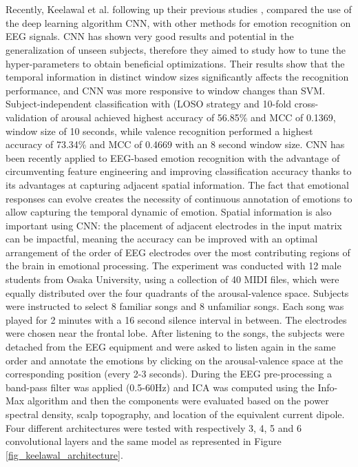 \\
\\
Recently, Keelawal et al. \cite{keelawat_comparative_2021} following up their previous studies \cite{thammasan_continuous_2016}, \cite{keelawat_spatiotemporal_2019} compared the use of the deep learning algorithm \ac{CNN}, with other methods for emotion recognition on \ac{EEG} signals. \ac{CNN} has shown very good results and potential in the generalization of unseen subjects, therefore they aimed to study how to tune the hyper-parameters to obtain beneficial optimizations. Their results show that the temporal information in distinct window sizes significantly affects the recognition performance, and \ac{CNN} was more responsive to window changes than \ac{SVM}. Subject-independent classification with (\ac{LOSO} strategy and 10-fold cross-validation of arousal achieved highest accuracy of 56.85\% and \ac{MCC} of 0.1369, window size of 10 seconds, while valence recognition performed a highest accuracy of 73.34\% and \ac{MCC} of 0.4669 with an 8 second window size. \ac{CNN} has been recently applied to EEG-based emotion recognition with the advantage of circumventing feature engineering and improving classification accuracy thanks to its advantages at capturing adjacent spatial information. The fact that emotional responses can evolve creates the necessity of continuous annotation of emotions to allow capturing the temporal dynamic of emotion. Spatial information is also important using \ac{CNN}: the placement of adjacent electrodes in the input matrix can be impactful, meaning the accuracy can be improved with an optimal arrangement of the order of \ac{EEG} electrodes over the most contributing regions of the brain in emotional processing.
The experiment was conducted with 12 male students from Osaka University, using a collection of 40 MIDI files, which were equally distributed over the four quadrants of the arousal-valence space. Subjects were instructed to select 8 familiar songs and 8 unfamiliar songs. Each song was played for 2 minutes with a 16 second silence interval in between. The electrodes were chosen near the frontal lobe. After listening to the songs, the subjects were detached from the \ac{EEG} equipment and were asked to listen again in the same order and annotate the emotions by clicking on the arousal-valence space at the corresponding position (every 2-3 seconds). During the \ac{EEG} pre-processing a band-pass filter was applied (0.5-60Hz) and \ac{ICA} was computed using the Info-Max algorithm and then the components were evaluated based on the power spectral density, scalp topography, and location of the equivalent current dipole.
Four different architectures were tested with respectively 3, 4, 5 and 6 convolutional layers and the same model as represented in Figure \ref{fig_keelawal_architecture}. 

